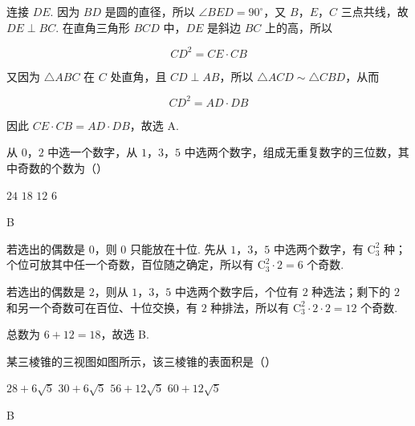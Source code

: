 \begin{solution}
连接 \(DE\). 因为 \(BD\) 是圆的直径，所以 \(\angle BED=90^\circ\)，又 \(B\)，\(E\)，\(C\) 三点共线，故 \(DE\perp BC\). 在直角三角形 \(BCD\) 中，\(DE\) 是斜边 \(BC\) 上的高，所以

\[
CD^2=CE\cdot CB
\]

又因为 \(\triangle ABC\) 在 \(C\) 处直角，且 \(CD\perp AB\)，所以 \(\triangle ACD\sim\triangle CBD\)，从而

\[
CD^2=AD\cdot DB
\]

因此 \(CE\cdot CB=AD\cdot DB\)，故选 A.
\end{solution}

\begin{problem}
从 \(0\)，\(2\) 中选一个数字，从 \(1\)，\(3\)，\(5\) 中选两个数字，组成无重复数字的三位数，其中奇数的个数为（\quad）

\choices
    {\(24\)}
    {\(18\)}
    {\(12\)}
    {\(6\)}
\end{problem}

\begin{answer}
B
\end{answer}

\begin{solution}
若选出的偶数是 \(0\)，则 \(0\) 只能放在十位. 先从 \(1\)，\(3\)，\(5\) 中选两个数字，有 \(\mathrm C_3^2\) 种；个位可放其中任一个奇数，百位随之确定，所以有 \(\mathrm C_3^2\cdot2=6\) 个奇数.

若选出的偶数是 \(2\)，则从 \(1\)，\(3\)，\(5\) 中选两个数字后，个位有 \(2\) 种选法；剩下的 \(2\) 和另一个奇数可在百位、十位交换，有 \(2\) 种排法，所以有 \(\mathrm C_3^2\cdot2\cdot2=12\) 个奇数.

总数为 \(6+12=18\)，故选 B.
\end{solution}

\begin{problem}
某三棱锥的三视图如图所示，该三棱锥的表面积是（\quad）


\choices
    {\(28 + 6\sqrt{5}\)}
    {\(30 + 6\sqrt{5}\)}
    {\(56 + 12\sqrt{5}\)}
    {\(60 + 12\sqrt{5}\)}
\end{problem}

\begin{answer}
B
\end{answer}

